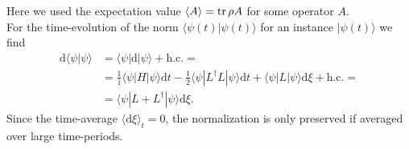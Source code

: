 \documentclass[english, parskip=full]{scrartcl}
\newcommand{\bra}{}
\newcommand{\brak}{}
\newcommand{\braket}{}
\newcommand{\tecxt}{}
\newcommand{\Bra}{}
\newcommand{\Ket}{}
\renewcommand{\i}{\text{i}}
\begin{document}
Here we used the expectation value $\bra\langle {A}\rangle = \tecxt\text{tr\,} \rho A$ for some operator $A$.
\\
For the time-evolution of the norm $\brak\langle {\psi(t)}| {\psi(t)}\rangle$ for an instance $\Ket | {\psi(t)} \rangle$ we find
\begin{align}
\tecxt\text{d}\brak\langle {\psi}| {\psi}\rangle &= \Bra\langle {\psi} | \tecxt\text{d}\Ket | {\psi} \rangle + \tecxt\text{h.c.} = \\
&= \frac{1}{\i}\braket\langle {\psi} | {H} | {\psi}\rangle \tecxt\text{d}t - \frac{1}{2} \braket\langle {\psi} | {L^\dagger L} | {\psi}\rangle \tecxt\text{d}t + \braket\langle {\psi} | {L} | {\psi}\rangle \tecxt\text{d}\xi + \tecxt\text{h.c.} = \\
&= \braket\langle {\psi} | {L + L^\dagger } | {\psi}\rangle \tecxt\text{d}\xi. 
\end{align}
Since the time-average $\bra\langle {\tecxt\text{d}\xi}\rangle_t = 0$, the normalization is only preserved if averaged over large time-periods.


\newpage
\end{document}
